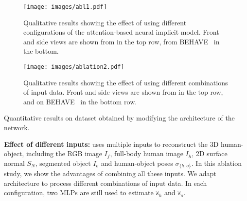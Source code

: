 \begin{figure*}[t]
  \centering
\texttt{[image: images/abl1.pdf]}
\vspace{-7mm}
\caption{Qualitative results showing the effect of using different configurations of the attention-based neural implicit model. Front and side views are shown from \dataname in the top row, from BEHAVE~\cite{bhatnagar2022behave} in the bottom.}
\label{fig:abl1}
\vspace{-4mm}
\end{figure*}
\begin{figure*}[h]
  \centering
\texttt{[image: images/ablation2.pdf]}
\vspace{-3mm}
\caption{Qualitative results showing the effect of using different combinations of input data. Front and side views are shown from \dataname in the top row, and on BEHAVE~\cite{bhatnagar2022behave} in the bottom row.}
\label{fig:abl2}
\vspace{-6mm}
\end{figure*}
\begin{table}[t]
\vspace{-3mm}
\centering
\resizebox{\linewidth}{!}
{}
\vspace{-3.5mm}
\caption{Quantitative results on \dataname dataset obtained by modifying the architecture of the network.}
\vspace{-6.5mm}
\label{tab:abl1}
\end{table}
\indent \textbf{Effect of different inputs:}
\name uses multiple inputs to reconstruct the 3D human-object, including the RGB image $I_f$, full-body human image $I_h$, 2D surface normal $S_N$, segmented object $I_o$ and human-object poses $\sigma_{\{h,o\}}$. In this ablation study, we show the advantages of combining all these inputs. We adapt \name architecture to process different combinations of input data. In each configuration, two MLPs are still used to estimate $\hat{s}_h$ and $\hat{s}_o$.
